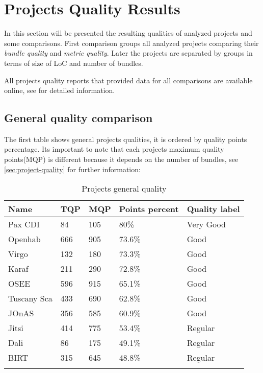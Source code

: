 \section{Projects Quality Results}
In this section will be presented the resulting qualities of analyzed projects and some comparisons. First comparison groups all analyzed  projects comparing their \emph{bundle quality} and \emph{metric quality}. Later the projects are separated by groups in terms of size of LoC and number of bundles.

All projects quality reports that provided data for all comparisons are available online, see \citep{intrabundle reports 2014} for detailed information. 

\subsection{General quality comparison}

The first table shows general projects qualities, it is ordered by quality points percentage. Its important to note that each projects maximum quality points(MQP) is different because it depends on the number of bundles, see \ref{sec:project-quality} for further information:

\begin{table}[h]
\caption{Projects general quality}
\label{projects-general-quality}
    \begin{tabular}{  p{3cm} | p{2cm} | p{2cm} | p{3cm} | p{4cm}}
    \Xhline{2\arrayrulewidth}
    Name & TQP & MQP & Points percent & Quality label \\  \hline
    Pax CDI & 84 & 105 & 80\% & Very Good\\ \hline 
    Openhab & 	666 & 905 & 73.6\% & Good\\ \hline
    Virgo & 132 & 180 & 73.3\% & Good\\ \hline
    Karaf & 211 & 290 & 72.8\% & Good\\ \hline
    OSEE & 596 & 915 & 65.1\% & Good\\ \hline
    Tuscany Sca & 433 & 690 & 62.8\% & Good\\ \hline
    JOnAS & 356 & 585 & 60.9\%  & Good\\ \hline
    Jitsi & 414 & 775 & 53.4\% & Regular\\ \hline
    Dali & 86 & 175 & 49.1\%  & Regular\\ \hline
    BIRT & 315 & 645 & 48.8\% & Regular\\ 
   \Xhline{2\arrayrulewidth}
    \end{tabular}
\end{table}
\FloatBarrier 

